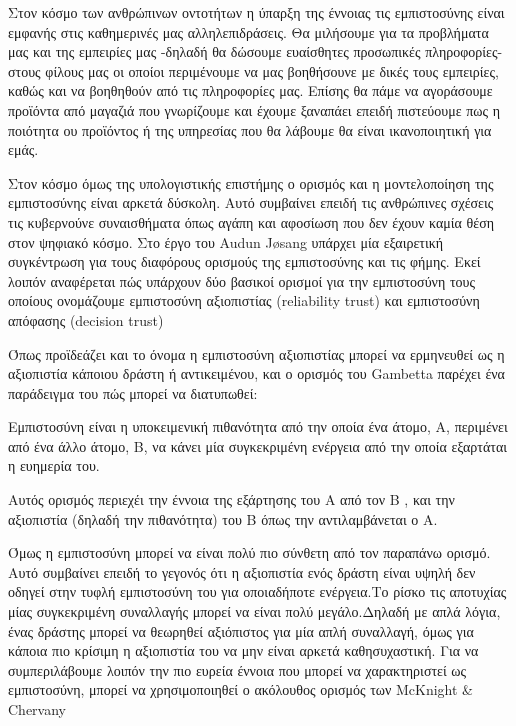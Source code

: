 Στον κόσμο των ανθρώπινων οντοτήτων η ύπαρξη της έννοιας τις εμπιστοσύνης είναι εμφανής στις καθημερινές μας αλληλεπιδράσεις. Θα μιλήσουμε για τα προβλήματα μας και της εμπειρίες μας -δηλαδή θα δώσουμε ευαίσθητες προσωπικές πληροφορίες- στους φίλους μας οι οποίοι περιμένουμε να μας βοηθήσουνε με δικές τους εμπειρίες, καθώς και να βοηθηθούν από τις πληροφορίες μας. Επίσης θα πάμε να αγοράσουμε προϊόντα από μαγαζιά που γνωρίζουμε και έχουμε ξαναπάει επειδή πιστεύουμε πως η ποιότητα ου προϊόντος ή της υπηρεσίας που θα λάβουμε θα είναι ικανοποιητική για εμάς.

Στον κόσμο όμως της υπολογιστικής επιστήμης ο ορισμός και η μοντελοποίηση της εμπιστοσύνης είναι αρκετά δύσκολη. Αυτό συμβαίνει επειδή τις ανθρώπινες σχέσεις τις κυβερνούνε συναισθήματα όπως αγάπη και αφοσίωση που δεν έχουν καμία θέση στον ψηφιακό κόσμο. Στο έργο του Audun Jøsang %
υπάρχει μία εξαιρετική συγκέντρωση για τους διαφόρους ορισμούς της εμπιστοσύνης και τις φήμης.
Εκεί λοιπόν αναφέρεται πώς υπάρχουν δύο βασικοί ορισμοί για την εμπιστοσύνη τους οποίους ονομάζουμε εμπιστοσύνη αξιοπιστίας (reliability trust) και εμπιστοσύνη απόφασης (decision trust)


Όπως προϊδεάζει και το όνομα η εμπιστοσύνη αξιοπιστίας μπορεί να ερμηνευθεί ως η αξιοπιστία κάποιου δράστη ή αντικειμένου, και ο ορισμός του Gambetta%
 παρέχει ένα παράδειγμα του πώς μπορεί να διατυπωθεί:
\begin{reliability}
Εμπιστοσύνη είναι η υποκειμενική πιθανότητα από την οποία ένα άτομο, Α, περιμένει από ένα άλλο άτομο, Β, να κάνει μία συγκεκριμένη ενέργεια από την οποία εξαρτάται η ευημερία του.
\end{reliability}

Αυτός ορισμός περιεχέι την έννοια της εξάρτησης του Α από τον Β , και την αξιοπιστία (δηλαδή την πιθανότητα) του Β όπως την αντιλαμβάνεται ο Α.

Όμως η εμπιστοσύνη μπορεί να είναι πολύ πιο σύνθετη από τον παραπάνω ορισμό. Αυτό συμβαίνει επειδή το γεγονός ότι η αξιοπιστία ενός δράστη είναι υψηλή δεν οδηγεί στην τυφλή εμπιστοσύνη του για οποιαδήποτε ενέργεια.Το ρίσκο τις αποτυχίας μίας συγκεκριμένη συναλλαγής μπορεί να είναι πολύ μεγάλο.Δηλαδή με απλά λόγια, ένας δράστης μπορεί να θεωρηθεί αξιόπιστος για μία απλή συναλλαγή, όμως για κάποια πιο κρίσιμη η αξιοπιστία του να μην είναι αρκετά καθησυχαστική. Για να συμπεριλάβουμε λοιπόν την πιο ευρεία έννοια που μπορεί να χαρακτηριστεί ως εμπιστοσύνη, μπορεί να χρησιμοποιηθεί ο ακόλουθος ορισμός των  McKnight \& Chervany %

